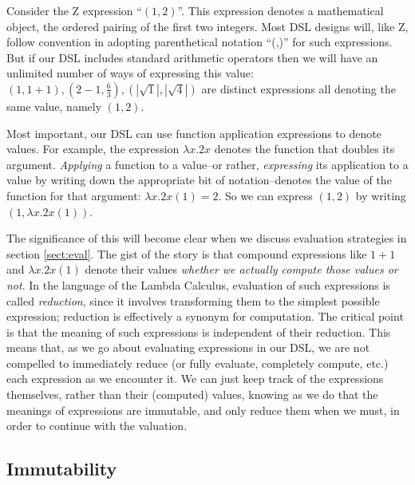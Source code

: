 \documentclass[reqno,12pt]{tufte-handout}
\numberwithin{equation}{subsection}
\numberwithin{equation}{subsection}
\begin{document}

Consider the Z expression ``\((1,2)\)''.  This expression denotes a
mathematical object, the ordered pairing of the first two integers.
Most DSL designs will, like Z, follow convention in adopting
parenthetical notation ``(,)'' for such expressions.  But if our DSL
includes standard arithmetic operators then we will have an unlimited
number of ways of expressing this value: \((1,1+1), (2-1,\frac{6}{3}),
(|\sqrt{1}|,|\sqrt{4}|)\) are distinct expressions all denoting the same
value, namely \((1,2)\).

Most important, our DSL can use function application expressions to
denote values.  For example, the expression \(\lambda x.2x\) denotes
the function that doubles its argument.  \textit{Applying} a function
to a value--or rather, \textit{expressing} its application to a value
by writing down the appropriate bit of notation--denotes the value of
the function for that argument: \(\lambda x.2x(1) = 2\).  So we can
express \((1,2)\) by writing \((1,\lambda x.2x(1))\).

The significance of this will become clear when we discuss evaluation
strategies in section \ref{sect:eval}.  The gist of the story is that
compound expressions like \(1+1\) and \(\lambda x.2x(1)\) denote their
values \textit{whether we actually compute those values or not}.  In
the language of the Lambda Calculus, evaluation of such expressions is
called \textit{reduction}, since it involves transforming them to the
simplest possible expression; reduction is effectively a synonym for
computation.  The critical point is that the meaning of such
expressions is independent of their reduction.  This means that, as we
go about evaluating expressions in our DSL, we are not compelled to
immediately reduce (or fully evaluate, completely compute, etc.) each
expression as we encounter it.  We can just keep track of the
expressions themselves, rather than their (computed) values, knowing
as we do that the meanings of expressions are immutable, and only
reduce them when we must, in order to continue with the valuation.

\subsection{Immutability}
\label{subs:immutability}
\end{document}
